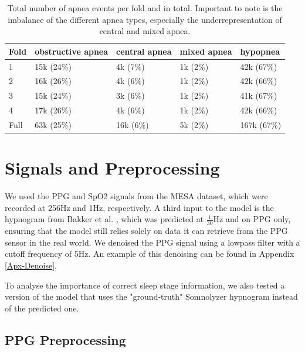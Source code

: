 \renewcommand{\arraystretch}{1.5}
\begin{table}
    \centering
    \begin{tabular}{p{1cm} p{1.7cm} p{1.7cm} p{1.7cm} p{1.8cm}}
        Fold & obstructive \newline apnea & central \newline apnea & mixed \newline apnea & hypopnea \\
        \hline
        1 & 15k (24\%) & 4k (7\%) & 1k (2\%) & 42k (67\%) \\
        2 & 16k (26\%) & 4k (6\%) & 1k (2\%) & 42k (66\%) \\
        3 & 15k (24\%) & 3k (6\%) & 1k (2\%) & 41k (67\%) \\
        4 & 17k (26\%) & 4k (6\%) & 1k (2\%) & 42k (66\%) \\
        \hline
        Full & 63k (25\%) & 16k (6\%) & 5k (2\%) & 167k (67\%) \\
    \end{tabular}
    \caption{Total number of apnea events per fold and in total. Important to note is the imbalance of the different apnea types, especially the underrepresentation of central and mixed apnea. \label{tab:dataset-apnea-classes}}
\end{table}

\section{Signals and Preprocessing}

We used the PPG and SpO2 signals from the MESA dataset, which were recorded at 256Hz and 1Hz, respectively. A third input to the model is the hypnogram from Bakker et al. \cite{bakker2021estimating}, which was predicted at $\frac{1}{30}$Hz and on PPG only, ensuring that the model still relies solely on data it can retrieve from the PPG sensor in the real world.
We denoised the PPG signal using a lowpass filter with a cutoff frequency of 5Hz. An example of this denoising can be found in Appendix \ref{Apx-Denoise}.

To analyse the importance of correct sleep stage information, we also tested a version of the model that uses the "ground-truth" Somnolyzer hypnogram instead of the predicted one.

\subsection*{PPG Preprocessing}


